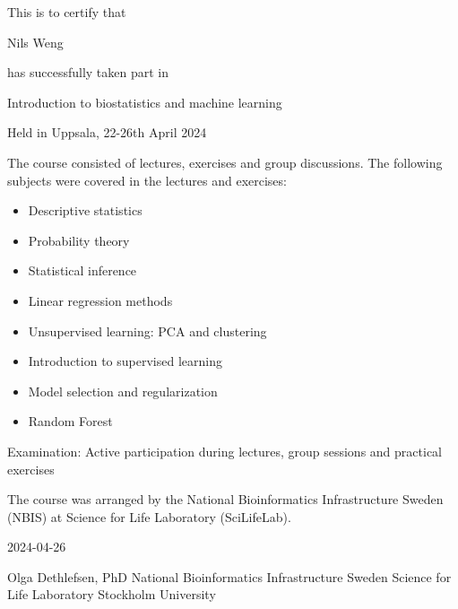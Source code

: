 \documentclass[12pt]{article}\usepackage[]{graphicx}\usepackage[]{color}
\newcommand{\courseName}{Introduction to biostatistics and machine learning}
\newcommand{\courseLocation}{in Uppsala}
\newcommand{\courseDate}{22-26th April 2024}
\newcommand{\courseLastDay}{2024-04-26}
\newcommand{\courseExaminer}{Olga Dethlefsen, PhD}
\begin{document}
\large
This is to certify that 


\LARGE
Nils Weng

\large
has successfully taken part in \newline

\LARGE
\begin{center}{\courseName}  \end{center} 


\large
\begin{center} Held  {\courseLocation}, {\courseDate} \end{center} 

\vspace{5mm}
\normalsize
The course consisted of lectures, exercises and group discussions. The following subjects were covered in the lectures and exercises:
\begin{itemize}
  \item Descriptive statistics 
  \item Probability theory
  \item Statistical inference
  \item Linear regression methods
  \item Unsupervised learning: PCA and clustering
  \item Introduction to supervised learning 
  \item Model selection and regularization
  \item Random Forest
\end{itemize}


\vspace{5mm}
Examination: \newline
Active participation during lectures, group sessions and practical exercises

\vspace{8mm}
The course was arranged by the National Bioinformatics Infrastructure Sweden (NBIS) at Science for Life Laboratory (SciLifeLab).


\vspace{8mm}
 {\courseLastDay}
\vspace{22mm}


{\courseExaminer} \newline
\small
National Bioinformatics Infrastructure Sweden \newline
Science for Life Laboratory \newline
Stockholm University \newline
\end{document}
